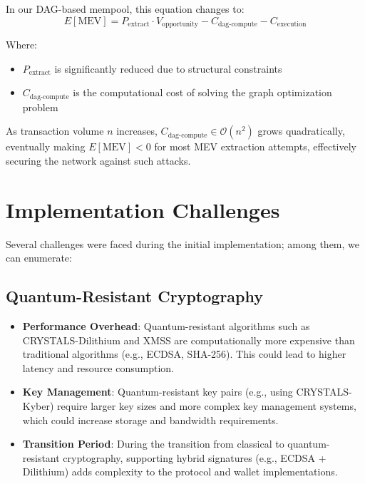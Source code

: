 \documentclass[12pt]{article}
\begin{document}
In our DAG-based mempool, this equation changes to:
\begin{equation}
E[\text{MEV}] = P_{\text{extract}} \cdot V_{\text{opportunity}} - C_{\text{dag-compute}} - C_{\text{execution}}
\end{equation}

Where:
\begin{itemize}
\item $P_{\text{extract}}$ is significantly reduced due to structural constraints
\item $C_{\text{dag-compute}}$ is the computational cost of solving the graph optimization problem
\end{itemize}

As transaction volume $n$ increases, $C_{\text{dag-compute}} \in \mathcal{O}(n^2)$ grows quadratically, eventually making $E[\text{MEV}] < 0$ for most MEV extraction attempts, effectively securing the network against such attacks.


\section{Implementation Challenges}

Several challenges were faced during the initial implementation; among them, we can enumerate: 

\subsection{Quantum-Resistant Cryptography}

\begin{itemize}
    \item \textbf{Performance Overhead}: Quantum-resistant algorithms such as CRYSTALS-Dilithium and XMSS are computationally more expensive than traditional algorithms (e.g., ECDSA, SHA-256). This could lead to higher latency and resource consumption.

    \item \textbf{Key Management}: Quantum-resistant key pairs (e.g., using CRYSTALS-Kyber) require larger key sizes and more complex key management systems, which could increase storage and bandwidth requirements.

    \item \textbf{Transition Period}: During the transition from classical to quantum-resistant cryptography, supporting hybrid signatures (e.g., ECDSA + Dilithium) adds complexity to the protocol and wallet implementations.

\end{itemize}
\end{document}
